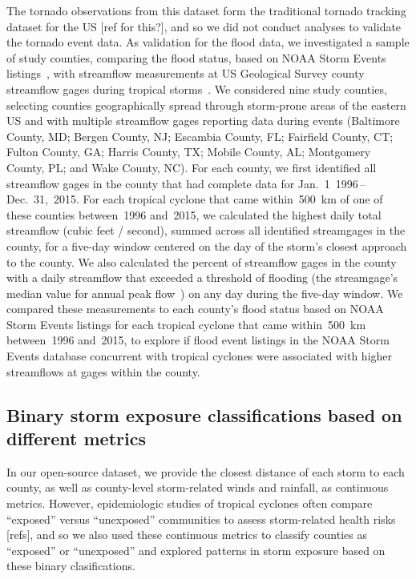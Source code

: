 The tornado observations from this dataset form the traditional tornado
tracking dataset for the \ac{US} [ref for this?], and so we did not conduct
analyses to validate the tornado event data.  As validation for the
flood data, we investigated a sample of study counties, comparing the flood
status, based on NOAA Storm Events listings~\parencite{stormevents,
noaastormevents}, with streamflow measurements at \ac{US} Geological Survey county
streamflow gages during tropical storms~\parencite{usgsgages, countyfloods,
dataRetrieval}.  We considered nine study counties, selecting counties
geographically spread through storm-prone areas of the eastern \ac{US} and with
multiple streamflow gages reporting data during events (Baltimore County, MD;
Bergen County, NJ; Escambia County, FL; Fairfield County, CT; Fulton County,
GA; Harris County, TX; Mobile County, AL; Montgomery County, PL; and Wake
County, NC). For each county, we first identified all streamflow gages in the
county that had complete data for Jan.~1~1996\,--\,Dec.~31,~2015. For each
tropical cyclone that came within~500~\si{\kilo\metre} of one of these counties
between~1996 and~2015, we calculated the highest daily total streamflow (cubic
feet / second), summed across all identified streamgages in the county, for a
five-day window centered on the day of the storm's closest approach to the
county.  We also calculated the percent of streamflow gages in the county with
a daily streamflow that exceeded a threshold of flooding (the streamgage's
median value for annual peak flow~\parencite{countyfloods}) on any day during
the five-day window. We compared these measurements to each county's flood
status based on NOAA Storm Events listings for each tropical cyclone that came
within~500~\si{\kilo\metre} between~1996 and~2015, to explore if flood event
listings in the NOAA Storm Events database concurrent with tropical cyclones
were associated with higher streamflows at gages within the county.

\subsection*{Binary storm exposure classifications based on different metrics}

In our open-source dataset, we provide the closest distance of each storm to
each county, as well as county-level storm-related winds and rainfall, as
continuous metrics. However, epidemiologic studies of tropical cyclones often
compare ``exposed'' versus ``unexposed'' communities to assess storm-related
health risks [refs], and so we also used these continuous metrics to classify
counties as ``exposed'' or ``unexposed'' and explored patterns in storm
exposure based on these binary clasifications. 

